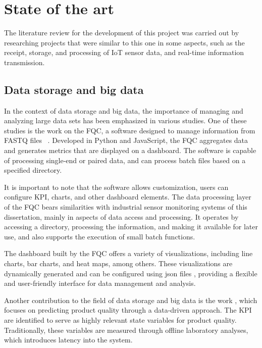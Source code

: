 \chapter{State of the art}\label{cap:conceptual}

The literature review for the development of this project was carried out by researching projects that were similar to this one in some aspects, such as the receipt, storage, and processing of \gls{IoT} sensor data, and real-time information transmission.

\section{Data storage and big data}

In the context of data storage and big data, the importance of managing and analyzing large data sets has been emphasized in various studies. One of these studies is the work on the \gls{FQC}, a software designed to manage information from FASTQ files ~\cite{fqc2017}. Developed in Python and JavaScript, the \gls{FQC} aggregates data and generates metrics that are displayed on a dashboard. The software is capable of processing single-end or paired data, and can process batch files based on a specified directory.

It is important to note that the software allows customization, users can configure \gls{KPI}, charts, and other dashboard elements. The data processing layer of the \gls{FQC} bears similarities with industrial sensor monitoring systems of this dissertation, mainly in aspects of data access and processing. It operates by accessing a directory, processing the information, and making it available for later use, and also supports the execution of small batch functions.

The dashboard built by the FQC offers a variety of visualizations, including line charts, bar charts, and heat maps, among others. These visualizations are dynamically generated and can be configured using \gls{json} files \cite{mdnJson}, providing a flexible and user-friendly interface for data management and analysis.

Another contribution to the field of data storage and big data is the work \cite{ren2021data}, which focuses on predicting product quality through a data-driven approach. The \gls{KPI} are identified to serve as highly relevant state variables for product quality. Traditionally, these variables are measured through offline laboratory analyses, which introduces latency into the system.

